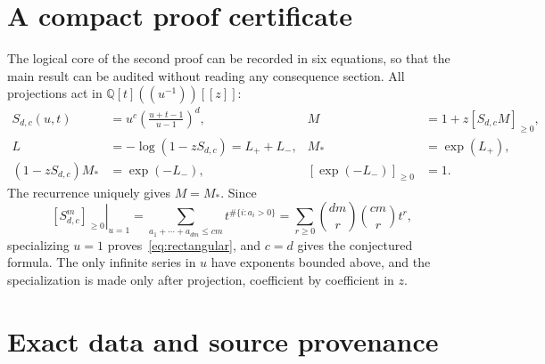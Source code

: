 \documentclass[11pt]{article}
\numberwithin{equation}{section}
\theoremstyle{definition}
\newcommand{\Q}{\mathbb Q}
\newcommand{\pos}[1]{\left[#1\right]_{\geq0}}
\begin{document}
\appendix
\section{A compact proof certificate}
\label{app:certificate}

The logical core of the second proof can be recorded in six equations, so that
the main result can be audited without reading any consequence section. All
projections act in $\Q[t]((u^{-1}))[[z]]$:
\begin{align*}
 S_{d,c}(u,t)&=u^c\left(\frac{u+t-1}{u-1}\right)^d,
       & M&=1+z\pos{S_{d,c}M},\\
 L&=-\log(1-zS_{d,c})=L_++L_-,
       & M_*&=\exp(L_+),\\
 (1-zS_{d,c})M_*&=\exp(-L_-),
       &\pos{\exp(-L_-)}&=1.
\end{align*}
The recurrence uniquely gives $M=M_*$. Since
\[
 \left.\pos{S_{d,c}^m}\right|_{u=1}
 =\sum_{a_1+\cdots+a_{dm}\leq cm}t^{\#\{i:a_i>0\}}
 =\sum_{r\geq0}\binom{dm}{r}\binom{cm}{r}t^r,
\]
specializing $u=1$ proves~\eqref{eq:rectangular}, and $c=d$ gives the
conjectured formula. The only infinite series in $u$ have exponents bounded
above, and the specialization is made only after projection, coefficient by
coefficient in $z$.

\section{Exact data and source provenance}
\label{app:data}
\end{document}
